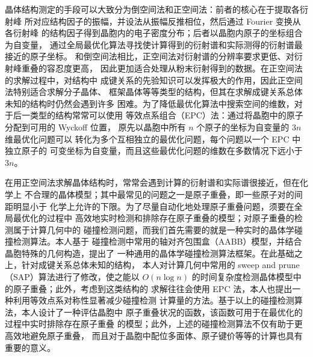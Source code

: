 
\begin{cabstract}\raggedbottom
	晶体结构测定的手段可以大致分为倒空间法和正空间法：前者的核心在于提取各衍射峰
	所对应结构因子的振幅，并设法从振幅反推相位，然后通过 Fourier 变换从各衍射峰
	的结构因子得到晶胞内的电子密度分布；后者以晶胞内原子的坐标组合为自变量，
	通过全局最优化算法寻找使计算得到的衍射谱和实际测得的衍射谱最接近的原子坐标。
	和倒空间法相比，正空间法对衍射谱的分辨率要求更低、对衍射峰重叠的容忍度更高，
	因此更加适合处理从粉末衍射得到的数据。在正空间法的求解过程中，对结构中
	成键关系的先验知识可以发挥极大的作用，因此正空间法特别适合求解分子晶体、
	框架晶体等等类型的结构，但其在求解成键关系总体未知的结构时仍然会遇到许多
	困难。为了降低最优化算法中搜索空间的维数，对于后一类型的结构常常可以使用
	等效点系组合（EPC）法：通过将晶胞中的原子分配到可用的 Wyckoff 位置，
	原先以晶胞中所有 $n$ 个原子的坐标为自变量的 $3n$ 维最优化问题可以
	转化为多个互相独立的最优化问题，每个问题以一个 EPC 中独立原子的
	可变坐标为自变量，而且这些最优化问题的维数在多数情况下远小于 $3n$。

	在用正空间法求解晶体结构时，常常会遇到计算的衍射谱和实际谱很接近，但在化学上
	不合理的晶体模型；其中最常见的问题之一是原子重叠，即一些原子对的间距明显小于
	化学上允许的下限。为了尽量自动化地处理原子重叠问题，须要在全局最优化的过程中
	高效地实时检测和排除存在原子重叠的模型；对原子重叠的检测属于计算几何中的
	碰撞检测问题，而我们首先需要的就是一种实时的晶体学碰撞检测算法。本人基于
	碰撞检测中常用的轴对齐包围盒（AABB）模型，并结合晶胞特殊的几何构造，提出了
	一种通用的晶体学碰撞检测算法框架。在此基础之上，针对成键关系总体未知的结构，
	本人对计算几何中常用的 sweep and prune（SAP）算法进行了修改，使之能以
	$O(n\log n)$ 的时间复杂度检测晶体模型中的原子重叠；此外，考虑到这类结构的
	求解往往会使用 EPC 法，本人也提出一种利用等效点系对称性显著减少碰撞检测
	计算量的方法。基于以上的碰撞检测算法，本人设计了一种评估晶胞中
	原子重叠状况的函数，该函数可用于在最优化的过程中实时排除存在原子重叠
	的模型；此外，上述的碰撞检测算法不仅有助于更高效地避免原子重叠，
	而且对于晶胞中配位多面体、原子键价等等的计算也具有重要的意义。


\end{cabstract}
